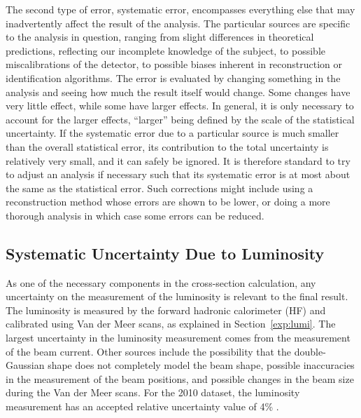 The second type of error, systematic error, 
encompasses everything else that may 
inadvertently 
affect the result of the analysis.  
The particular sources are specific to the analysis 
in question, 
ranging from slight differences 
in theoretical predictions, 
reflecting our incomplete knowledge of the subject, 
to possible miscalibrations of the detector, 
to possible biases inherent in reconstruction 
or identification algorithms.  
The error is evaluated by changing something 
in the analysis and seeing how much the 
result itself would change.  
Some changes have very little effect, 
while some have larger effects.  
In general, it is only necessary to account 
for the larger effects, 
``larger'' being defined by the scale 
of the statistical uncertainty.  
If the systematic error due to a particular 
source is much smaller than the 
overall statistical error, 
its contribution to the total uncertainty 
is relatively very small, 
and it can safely be ignored.  
It is therefore standard to try to adjust 
an analysis if necessary such that its 
systematic error is at most about the same as 
the statistical error.  
Such corrections might include using 
a reconstruction method whose errors 
are shown to be lower, 
or doing a more thorough analysis 
in which case some errors can be reduced.  




\subsection{Systematic Uncertainty Due to Luminosity}
\label{anMeth:SystsLumi}


As one of the necessary components in the 
cross-section calculation, 
any uncertainty on the measurement of the luminosity 
is relevant to the final result.  
The luminosity is measured by the forward hadronic calorimeter (HF) 
and calibrated using Van der Meer scans, 
as explained in Section~\ref{exp:lumi}.  
The largest uncertainty in the luminosity measurement 
comes from the measurement of the beam current.  
Other sources include the possibility that the 
double-Gaussian shape does not completely model the beam shape, 
possible inaccuracies in the measurement of the beam positions, 
and possible changes in the beam size during the Van der Meer scans.  
For the 2010 dataset, 
the luminosity measurement has an accepted 
relative uncertainty value of 4\% %
\cite{Lumi4DPS}.  

